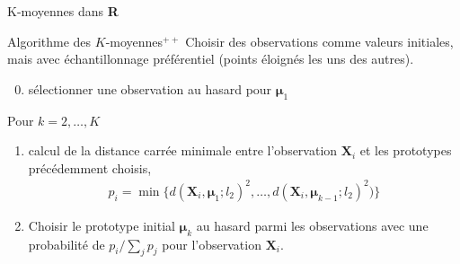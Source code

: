 \documentclass[
  ignorenonframetext,
]{beamer}
\newenvironment{Shaded}{\begin{snugshade}}{\end{snugshade}}
\newcommand{\AttributeTok}[1]{\textcolor[rgb]{0.40,0.45,0.13}{#1}}
\newcommand{\CommentTok}[1]{\textcolor[rgb]{0.37,0.37,0.37}{#1}}
\newcommand{\DecValTok}[1]{\textcolor[rgb]{0.68,0.00,0.00}{#1}}
\newcommand{\FunctionTok}[1]{\textcolor[rgb]{0.28,0.35,0.67}{#1}}
\newcommand{\NormalTok}[1]{\textcolor[rgb]{0.00,0.23,0.31}{#1}}
\newcommand{\OtherTok}[1]{\textcolor[rgb]{0.00,0.23,0.31}{#1}}
\newcommand{\SpecialCharTok}[1]{\textcolor[rgb]{0.37,0.37,0.37}{#1}}
\providecommand{\tightlist}{%
  \setlength{\itemsep}{0pt}\setlength{\parskip}{0pt}}\usepackage{longtable,booktabs,array}
\begin{document}
\begin{frame}[fragile]{K-moyennes dans \textbf{R}}
\protect\hypertarget{k-moyennes-dans-r}{}
\begin{Shaded}
\end{Shaded}
\end{frame}

\begin{frame}{Algorithme des \(K\)-moyennes\({}^{++}\)}
\protect\hypertarget{algorithme-des-k-moyennes}{}
Choisir des observations comme valeurs initiales, mais avec
échantillonnage préférentiel (points éloignés les uns des autres).

\begin{enumerate}
\setcounter{enumi}{-1}
\tightlist
\item
  sélectionner une observation au hasard pour \(\boldsymbol{\mu}_1\)
\end{enumerate}

Pour \(k=2, \ldots, K\)

\begin{enumerate}
\tightlist
\item
  calcul de la distance carrée minimale entre l'observation
  \(\mathbf{X}_i\) et les prototypes précédemment choisis,
  \begin{align*}
  p_i = \min \{d(\mathbf{X}_i, \boldsymbol{\mu}_1; l_2)^2, \ldots, d(\mathbf{X}_i, \boldsymbol{\mu}_{k-1}; l_2)^2)\}
  \end{align*}
\item
  Choisir le prototype initial \(\boldsymbol{\mu}_k\) au hasard parmi
  les observations avec une probabilité de \(p_i/\sum_{j} p_j\) pour
  l'observation \(\mathbf{X}_i\).
\end{enumerate}
\end{frame}
\end{document}
